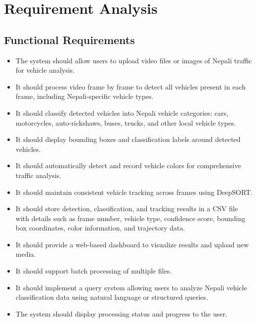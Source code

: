 \documentclass[12pt,a4paper]{report}
\begin{document}
\section{Requirement Analysis}

\subsection{Functional Requirements}
\begin{itemize}
    \item The system should allow users to upload video files or images of Nepali traffic for vehicle analysis.
    \item It should process video frame by frame to detect all vehicles present in each frame, including Nepali-specific vehicle types.
    \item It should classify detected vehicles into Nepali vehicle categories: cars, motorcycles, auto-rickshaws, buses, trucks, and other local vehicle types.
    \item It should display bounding boxes and classification labels around detected vehicles.
    \item It should automatically detect and record vehicle colors for comprehensive traffic analysis.
    \item It should maintain consistent vehicle tracking across frames using DeepSORT.
    \item It should store detection, classification, and tracking results in a CSV file with details such as frame number, vehicle type, confidence score, bounding box coordinates, color information, and trajectory data.
    \item It should provide a web-based dashboard to visualize results and upload new media.
    \item It should support batch processing of multiple files.
    \item It should implement a query system allowing users to analyze Nepali vehicle classification data using natural language or structured queries.
    \item The system should display processing status and progress to the user.
\end{itemize}
\end{document}
